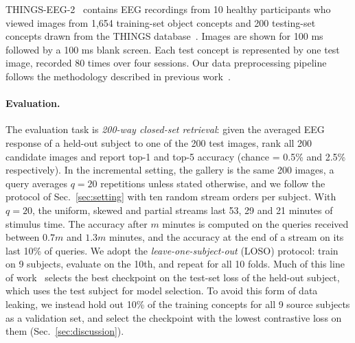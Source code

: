 \documentclass[10pt,twocolumn,letterpaper]{article}
\begin{document}
THINGS-EEG-2~\cite{gifford2022things} contains EEG recordings from 10 healthy participants who viewed images from 1,654 training-set object concepts and 200 testing-set concepts drawn from the THINGS database~\cite{hebart2019things}. Images are shown for 100 ms followed by a 100 ms blank screen. Each test concept is represented by one test image, recorded 80 times over four sessions. Our data preprocessing pipeline follows the methodology described in previous work~\cite{song2024nice,li2024atm,wu2025ubp}.

\paragraph{Evaluation.}
The evaluation task is \emph{200-way closed-set retrieval}: given the averaged EEG response of a held-out subject to one of the 200 test images, rank all 200 candidate images and report top-1 and top-5 accuracy (chance = 0.5\% and 2.5\% respectively). In the incremental setting, the gallery is the same 200 images, a query averages $q=20$ repetitions unless stated otherwise, and we follow the protocol of Sec.~\ref{sec:setting} with ten random stream orders per subject. With $q=20$, the uniform, skewed and partial streams last 53, 29 and 21 minutes of stimulus time. The accuracy after $m$ minutes is computed on the queries received between $0.7m$ and $1.3m$ minutes, and the accuracy at the end of a stream on its last 10\% of queries. We adopt the \emph{leave-one-subject-out} (LOSO) protocol: train on 9 subjects, evaluate on the 10th, and repeat for all 10 folds. Much of this line of work~\cite{zhang2025neurobridge,du2025shallow,huang2026sattc} selects the best checkpoint on the test-set loss of the held-out subject, which uses the test subject for model selection. To avoid this form of data leaking, we instead hold out 10\% of the training concepts for all 9 source subjects as a validation set, and select the checkpoint with the lowest contrastive loss on them (Sec.~\ref{sec:discussion}). 
\end{document}
